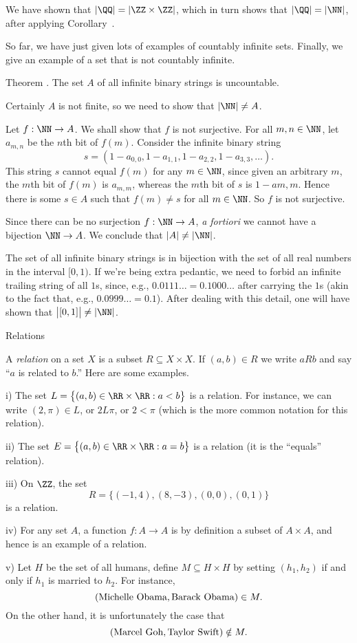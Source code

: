 We have shown that $|\QQ| = |\ZZ\times \ZZ|$, which in turn shows that $|\QQ| = |\NN|$, after
applying Corollary~{\corzedtwocountable}.\slug

So far, we have just given lots of examples of countably infinite sets. Finally, we give an example
of a set that is not countably infinite.

\proclaim Theorem \advthm. The set $A$ of all infinite binary strings is uncountable.

\proof Certainly $A$ is not finite, so we need to show that $|\NN|\ne A$.

Let $f : \NN\to A$. We shall show that $f$ is not surjective. For all $m,n\in \NN$, let $a_{m,n}$
be the $n$th bit of $f(m)$. Consider the infinite binary string
$$s = (1-a_{0,0},1-a_{1,1}, 1-a_{2,2}, 1-a_{3,3}, \ldots).$$
This string $s$ cannot equal $f(m)$ for any $m\in \NN$, since given an arbitrary $m$,
the $m$th bit of $f(m)$ is $a_{m,m}$, whereas the $m$th bit of $s$ is $1-a{m,m}$. Hence there is some
$s\in A$ such that $f(m)\ne s$ for all $m\in \NN$. So $f$ is not surjective.

Since there can be no surjection $f:\NN\to A$, {\it a fortiori} we cannot have a bijection $\NN\to A$.
We conclude that $|A| \ne |\NN|$.\slug

The set of all infinite binary strings is in bijection with the set of all real numbers in the interval
$[0,1)$. If we're being extra pedantic, we need to forbid an infinite trailing string of all $1$s,
since, e.g., $0.0111\ldots = 0.1000\ldots$ after carrying the $1$s (akin to the fact
that, e.g., $0.0999\ldots = 0.1$). After dealing with this detail, one will have shown that
$\bigl| [0,1]\bigr| \ne |\NN|$.

\advsect Relations

 A {\it relation} on a set $X$ is a subset $R\subseteq X\times X$. If $(a,b)\in R$
we write $aRb$ and say ``$a$ is related to $b$.'' Here are some examples.
\medskip
\item{i)} The set $L = \bigl\{(a,b)\in \RR\times\RR : a<b\bigr\}$ is a relation. For instance, we can
write $(2,\pi)\in L$, or $2L\pi$, or $2<\pi$ (which is the more common notation for this relation).
\smallskip
\item{ii)} The set $E = \bigl\{ (a,b) \in \RR\times \RR : a = b\bigr\}$ is a relation (it is the ``equals''
relation).
\smallskip
\item{iii)} On $\ZZ$, the set
$$R = \bigl\{(-1, 4), (8, -3), (0, 0), (0,1)\bigr\}$$
is a relation.
\smallskip
\item{iv)} For any set $A$, a function $f:A\to A$ is by definition a subset of $A\times A$, and hence
is an example of a relation.
\smallskip
\item{v)} Let $H$ be the set of all humans, define $M\subseteq H\times H$ by setting
$(h_1, h_2)$ if and only if $h_1$ is married to $h_2$. For instance,
$$(\hbox{Michelle Obama}, \hbox{Barack Obama})\in M.$$
On the other hand, it is unfortunately the case that
$$(\hbox{Marcel Goh}, \hbox{Taylor Swift})\notin M.$$
\medskip

